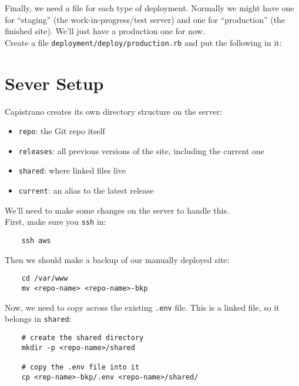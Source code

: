 Finally, we need a file for each type of deployment. Normally we might have one for ``staging'' (the work-in-progress/test server) and one for ``production'' (the finished site). We'll just have a production one for now.
\\

Create a file \texttt{deployment/deploy/production.rb} and put the following in it:



\section{Sever Setup}

Capistrano creates its own directory structure on the server:

\begin{itemize}
    \item \texttt{repo}: the Git repo itself
    \item \texttt{releases}: all previous versions of the site, including the current one
    \item \texttt{shared}: where linked files live
    \item \texttt{current}: an alias to the latest release
\end{itemize}

We'll need to make some changes on the server to handle this.
\\

First, make sure you \texttt{ssh} in:

\begin{verbatim}
    ssh aws
\end{verbatim}

Then we should make a backup of our manually deployed site:

\begin{verbatim}
    cd /var/www
    mv <repo-name> <repo-name>-bkp
\end{verbatim}

Now, we need to copy across the existing \texttt{.env} file. This is a linked file, so it belongs in \texttt{shared}:

\begin{verbatim}
    # create the shared directory
    mkdir -p <repo-name>/shared

    # copy the .env file into it
    cp <rep-name>-bkp/.env <repo-name>/shared/
\end{verbatim}

